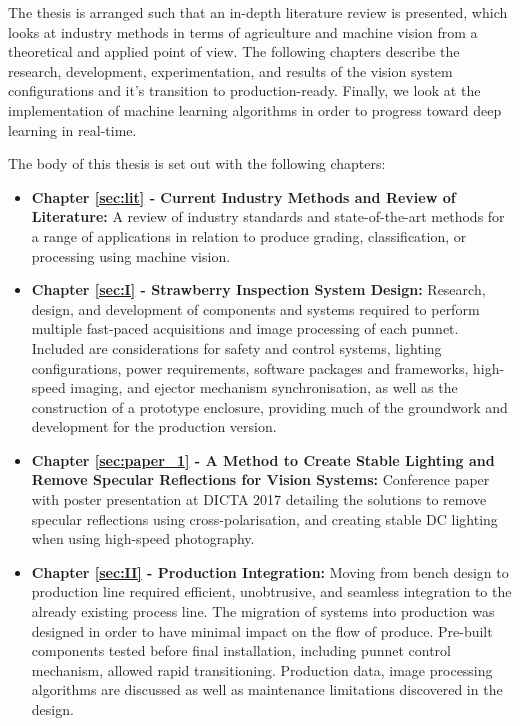 \documentclass[fleqn,twoside,12pt]{report}
\begin{document}
The thesis is arranged such that an in-depth literature review is presented, which looks at industry methods in terms of agriculture and machine vision from a theoretical and applied point of view. The following chapters describe the research, development, experimentation, and results of the vision system configurations and it's transition to production-ready. Finally, we look at the implementation of machine learning algorithms in order to progress toward deep learning in real-time.  

The body of this thesis is set out with the following chapters: 


\begin{itemize}
	\item \textbf{Chapter \ref{sec:lit} - Current Industry Methods and Review of Literature:} A review of industry standards and state-of-the-art methods for a range of applications in relation to produce grading, classification, or processing using machine vision. 
	
	\item \textbf{Chapter \ref{sec:I} - Strawberry Inspection System Design:} Research, design, and development of components and systems required to perform multiple fast-paced acquisitions and image processing of each punnet. Included are considerations for safety and control systems, lighting configurations, power requirements, software packages and frameworks, high-speed imaging, and ejector mechanism synchronisation, as well as the construction of a prototype enclosure, providing much of the groundwork and development for the production version. 
	
	\item \textbf{Chapter \ref{sec:paper_1} - A Method to Create Stable Lighting and Remove Specular Reflections for Vision Systems:} Conference paper with poster presentation at DICTA 2017 detailing the solutions to remove specular reflections using cross-polarisation, and creating stable DC lighting when using high-speed photography.
	
	\item \textbf{Chapter \ref{sec:II} - Production Integration:} Moving from bench design to production line required efficient, unobtrusive, and seamless integration to the already existing process line. The migration of systems into production was designed in order to have minimal impact on the flow of produce. Pre-built components tested before final installation, including punnet control mechanism, allowed rapid transitioning. Production data, image processing algorithms are discussed as well as maintenance limitations discovered in the design.
	

\end{itemize}
\end{document}
